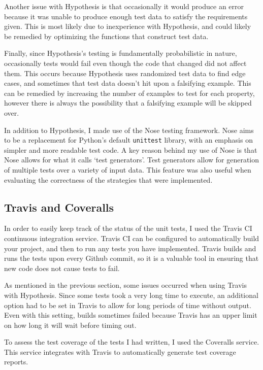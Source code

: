\documentclass[a4paper,12pt]{article}
\begin{document}
Another issue with Hypothesis is that occasionally it would produce an error because it was unable to produce enough test data to satisfy the requirements given.
This is most likely due to inexperience with Hypothesis, and could likely be remedied by optimizing the functions that construct test data.

Finally, since Hypothesis's testing is fundamentally probabilistic in nature, occasionally tests would fail even though the code that changed did not affect them.
This occurs because Hypothesis uses randomized test data to find edge cases, and sometimes that test data doesn't hit upon a falsifying example.
This can be remedied by increasing the number of examples to test for each property, however there is always the possibility that a falsifying example will be skipped over.

In addition to Hypothesis, I made use of the Nose testing framework.
Nose aims to be a replacement for Python's default \texttt{unittest} library, with an emphasis on simpler and more readable test code.
A key reason behind my use of Nose is that Nose allows for what it calls `test generators'.
Test generators allow for generation of multiple tests over a variety of input data.
This feature was also useful when evaluating the correctness of the strategies that were implemented.

\subsection{Travis and Coveralls}

In order to easily keep track of the status of the unit tests, I used the Travis CI continuous integration service.
Travis CI can be configured to automatically build your project, and then to run any tests you have implemented.
Travis builds and runs the tests upon every Github commit, so it is a valuable tool in ensuring that new code does not cause tests to fail.

As mentioned in the previous section, some issues occurred when using Travis with Hypothesis.
Since some tests took a very long time to execute, an additional option had to be set in Travis to allow for long periods of time without output.
Even with this setting, builds sometimes failed because Travis has an upper limit on how long it will wait before timing out.

To assess the test coverage of the tests I had written, I used the Coveralls service.
This service integrates with Travis to automatically generate test coverage reports.
\end{document}
